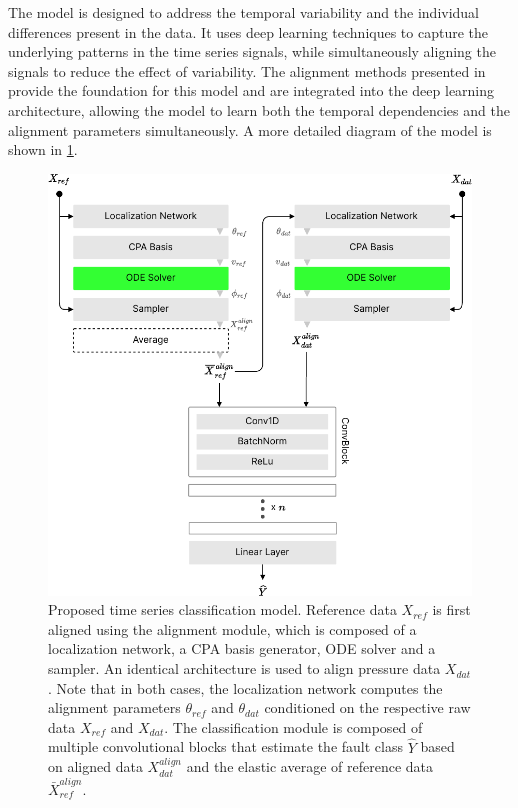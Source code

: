 The model is designed to address the temporal variability and the individual differences present in the data. It uses deep learning techniques to capture the underlying patterns in the time series signals, while simultaneously aligning the signals to reduce the effect of variability. The alignment methods presented in \cite{martinez2022closed} provide the foundation for this model and are integrated into the deep learning architecture, allowing the model to learn both the temporal dependencies and the alignment parameters simultaneously.
%
%
A more detailed diagram of the model is shown in \cref{fig:phm_method1}.
\begin{figure}[!htb]
    \begin{center}
    \includegraphics[width=\linewidth]{figures/phm3.pdf}
    \caption{Proposed time series classification model. Reference data $X_{ref}$ is first aligned using the alignment module, which is composed of a localization network, a CPA basis generator, ODE solver and a sampler. An identical architecture is used to align pressure data $X_{dat}$. Note that in both cases, the localization network computes the alignment parameters $\theta_{ref}$ and $\theta_{dat}$ conditioned on the respective raw data $X_{ref}$ and $X_{dat}$. The classification module is composed of multiple convolutional blocks that estimate the fault class $\hat{Y}$ based on aligned data $X_{dat}^{align}$ and the elastic average of reference data $\bar{X}_{ref}^{align}$.}
    \label{fig:phm_method1}
    \end{center}
    \vspace{-2em}
\end{figure}



